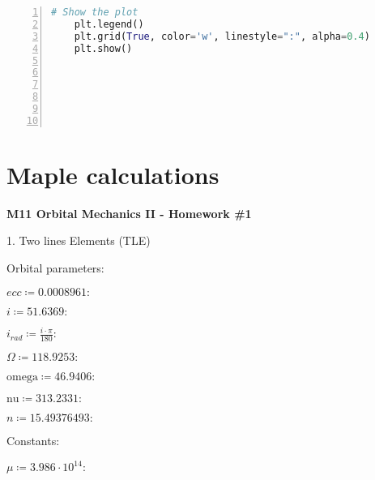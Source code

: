 \begin{appendices}
\begin{lstlisting}[frame=single, language=Python, numbers=left]
    # Show the plot
    plt.legend()
    plt.grid(True, color='w', linestyle=":", alpha=0.4)
    plt.show()







\end{lstlisting}


\newpage
\section{Maple calculations}
\label{sec:Maple}
\begin{Maple Normal}
\textbf{M11 Orbital Mechanics II - Homework \#1 }
\end{Maple Normal}
\begin{Maple Normal}
1. Two lines Elements (TLE)
\end{Maple Normal}
\begin{Maple Normal}

\end{Maple Normal}
\begin{Maple Normal}
Orbital parameters:
\end{Maple Normal}
\begin{Maple Normal}
{$ \displaystyle \mathit{ecc} \coloneqq  0.0008961\colon  $}
\end{Maple Normal}
\begin{Maple Normal}
{$ \displaystyle i \coloneqq  51.6369\colon  $}
\end{Maple Normal}
\begin{Maple Normal}
{$ \displaystyle i_{\mathit{rad}}\coloneqq \frac{i \cdot \pi}{180}\colon  $}
\end{Maple Normal}
\begin{Maple Normal}
{$ \displaystyle \Omega \coloneqq  118.9253\colon  $}
\end{Maple Normal}
\begin{Maple Normal}
{$ \displaystyle \mathrm{omega}\coloneqq  46.9406\colon  $}
\end{Maple Normal}
\begin{Maple Normal}

{$ \mathrm{nu}\coloneqq  313.2331\colon  $}
\end{Maple Normal}
\begin{Maple Normal}
{$ \displaystyle n \coloneqq  15.49376493\colon  $}
\end{Maple Normal}
\begin{Maple Normal}

\end{Maple Normal}
\begin{Maple Normal}
Constants:
\end{Maple Normal}
\begin{Maple Normal}
{$ \displaystyle \mu\coloneqq  3.986\cdot 10^{14}\colon  $}
\end{Maple Normal}
\begin{Maple Normal}


\end{Maple Normal}
\end{appendices}
